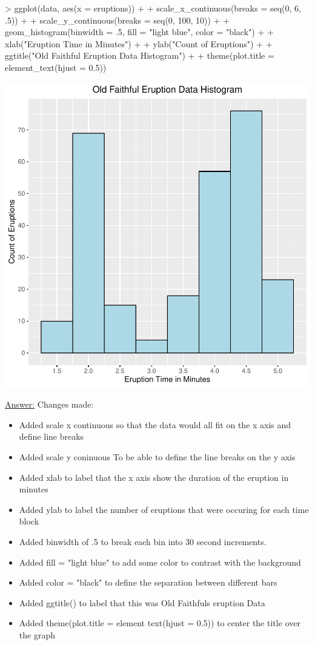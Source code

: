 \documentclass[12pt,letterpaper,final]{article}
\begin{document}
\begin{enumerate}
\begin{enumerate}
\begin{Schunk}
\begin{Sinput}
> ggplot(data, aes(x = eruptions)) + 
+   scale_x_continuous(breaks = seq(0, 6, .5)) +
+   scale_y_continuous(breaks = seq(0, 100, 10)) +
+   geom_histogram(binwidth = .5, fill = "light blue", color = "black") +
+   xlab("Eruption Time in Minutes") +
+   ylab("Count of Eruptions") +
+   ggtitle("Old Faithful Eruption Data Histogram") +
+   theme(plot.title = element_text(hjust = 0.5))
\end{Sinput}
\end{Schunk}
\includegraphics{rnw_example-003}

\underline{Answer:} Changes made:
\begin{itemize}
\item Added scale x continuous so that the data would all fit on the x axis and define line breaks
\item Added scale y coninuous To be able to define the line breaks on the y axis
\item Added xlab to label that the x axis show the duration of the eruption in minutes
\item Added ylab to label the number of eruptions that were occuring for each time block
\item Added binwidth of .5 to break each bin into 30 second increments.
\item Added fill = "light blue" to add some color to contrast with the background
\item Added color = "black" to define the separation between different bars
\item Added ggtitle() to label that this was Old Faithfuls eruption Data
\item Added theme(plot.title = element text(hjust = 0.5)) to center the title over the graph
\end{itemize}






\end{enumerate}
\end{enumerate}
\end{document}
